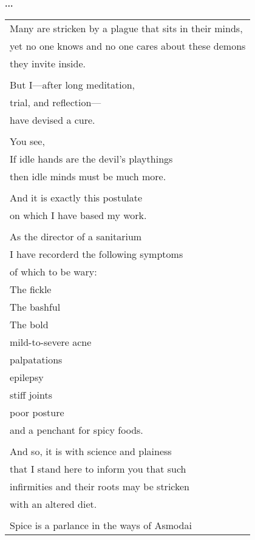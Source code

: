 \documentclass{article}
\begin{document}
\newcommand{\h}{\hspace*{4ex}}

\begin{center}
\textbf{...} \\
\vspace*{2ex}
\begin{longtable}{l}
Many are stricken by a plague that sits in their minds, \\
yet no one knows and no one cares about these demons \\
they invite inside. \\
\\
But I---after long meditation, \\
trial, and reflection--- \\
have devised a cure. \\
\\
You see, \\
If idle hands are the devil's playthings \\
then idle minds must be much more. \\
\\
And it is exactly this postulate \\
on which I have based my work. \\
\\
As the director of a sanitarium \\
I have recorderd the following symptoms \\
of which to be wary: \\
\h{}The fickle \\
\h{}The bashful \\
\h{}The bold \\
\h{}mild-to-severe acne \\
\h{}palpatations \\
\h{}epilepsy \\
\h{}stiff joints \\
\h{}poor posture \\
\h{}and a penchant for spicy foods. \\
\\
And so, it is with science and plainess \\
that I stand here to inform you that such \\
infirmities and their roots may be stricken \\
with an altered diet. \\
\\
Spice is a parlance in the ways of Asmodai \\

\end{longtable}
\end{center}
\end{document}
